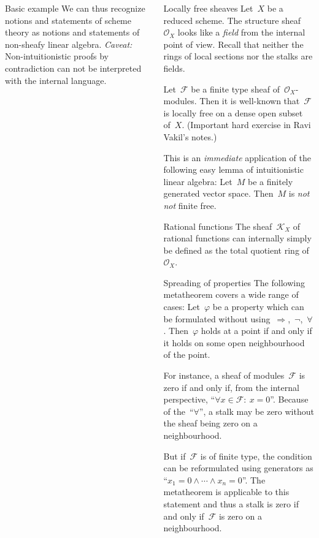 \documentclass[table]{beamer}
\newcommand{\F}{\mathcal{F}}
\renewcommand{\O}{\mathcal{O}}
\newcommand{\K}{\mathcal{K}}
\begin{document}
\begin{frame}[t]
\begin{columns}[t]
\begin{column}{0.3\textwidth}
\begin{block}{Basic example}
    We can thus recognize notions and statements of scheme theory as notions and
    statements of non-sheafy linear algebra.
    \emph{Caveat:} Non-intuitionistic proofs by contradiction can not be interpreted with the
    internal language.
  \end{block}
\end{column}

\begin{column}{0.3\textwidth}
  \begin{block}{Locally free sheaves}
    Let~$X$ be a reduced scheme. The structure sheaf~$\O_X$ looks like a \emph{field} from the
    internal point of view. Recall that neither the rings of
    local sections nor the stalks are fields.\medskip

    Let~$\F$ be a finite type sheaf of~$\O_X$-modules. 
    Then it is well-known that~$\F$ is locally free on a dense open subset
    of~$X$. (Important hard exercise in Ravi Vakil's notes.) \medskip

    This is an \emph{immediate} application of the following easy lemma of intuitionistic
    linear algebra: Let~$M$ be a finitely generated vector space. Then~$M$ is
    \emph{not not} finite free.
  \end{block}
  \bigskip

  \begin{block}{Rational functions}
    The sheaf~$\K_X$ of rational functions can internally simply be defined as
    the total quotient ring of~$\O_X$.
  \end{block}
  \bigskip

  \begin{block}{Spreading of properties}
    The following metatheorem covers a wide range of cases:
    Let~$\varphi$ be a property which can be formulated without
    using~$\Rightarrow$,~$\neg$,~$\forall$. Then~$\varphi$
    holds at a point if and only if it holds on some open neighbourhood of the
    point.\medskip

    For instance, a sheaf of modules~$\F$ is zero if and only if, from the
    internal perspective, ``$\forall x \in \F{:}\ x = 0$''. Because of
    the~``$\forall$'', a stalk may be zero without the sheaf being zero on a
    neighbourhood.\medskip

    But if~$\F$ is of finite type, the condition can be reformulated using
    generators as ``$x_1 = 0 \wedge \cdots \wedge x_n = 0$''. The metatheorem
    is applicable to this statement and thus a stalk is zero if and only if~$\F$
    is zero on a neighbourhood.
  \end{block}


\end{column}
\end{columns}
\end{frame}
\end{document}
